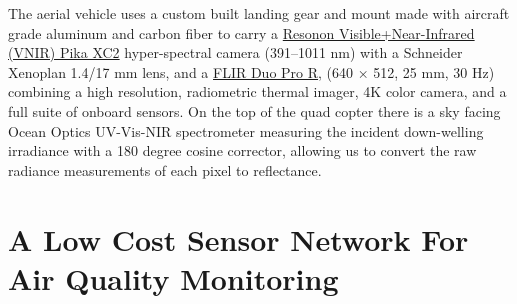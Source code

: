 The aerial vehicle uses a custom built landing gear and mount made with aircraft grade aluminum and carbon fiber to carry a \href{https://resonon.com/Pika-XC2}{Resonon Visible+Near-Infrared (VNIR) Pika XC2} hyper-spectral camera (391–1011 nm) with a Schneider Xenoplan 1.4/17 mm lens, and a \href{https://www.flir.com/products/duo-pro-r/}{FLIR Duo Pro R}, (640 × 512, 25 mm, 30 Hz) combining a high resolution, radiometric thermal imager, 4K color camera, and a full suite of onboard sensors. On the top of the quad copter there is a sky facing Ocean Optics UV-Vis-NIR spectrometer measuring the incident down-welling irradiance with a 180 degree cosine corrector, allowing us to convert the raw radiance measurements of each pixel to reflectance.







\section{A Low Cost Sensor Network For Air Quality Monitoring}

